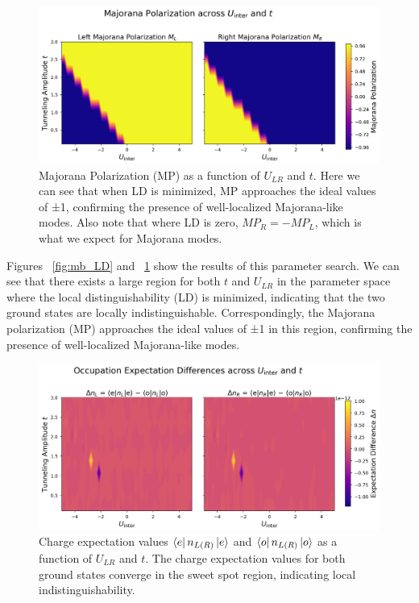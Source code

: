 \documentclass[11pt, letterpaper, titlepage]{article}
\begin{document}
\begin{figure}[htbp]
  \centering
  \includegraphics[width=1\textwidth]{../Figures/MP_mb.png}
  \caption{Majorana Polarization (MP) as a function of $U_{LR}$ and $t$. Here we can see that when LD is minimized, MP approaches the ideal values of ±1, confirming the presence of well-localized Majorana-like modes. Also note that where LD is zero, $MP_R=-MP_L$, which is what we expect for Majorana modes.}
  \label{fig:mb_MP}
\end{figure}
Figures ~\ref{fig:mb_LD} and ~\ref{fig:mb_MP} show the results of this parameter search. We can see that there exists a large region for both $t$ and $U_{LR}$ in the parameter space where the local distinguishability (LD) is minimized, indicating that the two ground states are locally indistinguishable. Correspondingly, the Majorana polarization (MP) approaches the ideal values of ±1 in this region, confirming the presence of well-localized Majorana-like modes.
\newpage 
\begin{figure}
  \centering
  \includegraphics[width=1\textwidth]{../Figures/Exp_mb.png}
  \caption{Charge expectation values $\bra{e}n_{L(R)}\ket{e}$ and $\bra{o}n_{L(R)}\ket{o}$ as a function of $U_{LR}$ and $t$. The charge expectation values for both ground states converge in the sweet spot region, indicating local indistinguishability.}
  \label{fig:mb_charge}
\end{figure}
\end{document}
